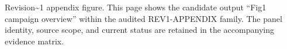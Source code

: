 Revision\textasciitilde{}1 appendix figure. This page shows the candidate output ``Fig1 campaign overview'' within the audited REV1-APPENDIX family. The panel identity, source scope, and current status are retained in the accompanying evidence matrix.
